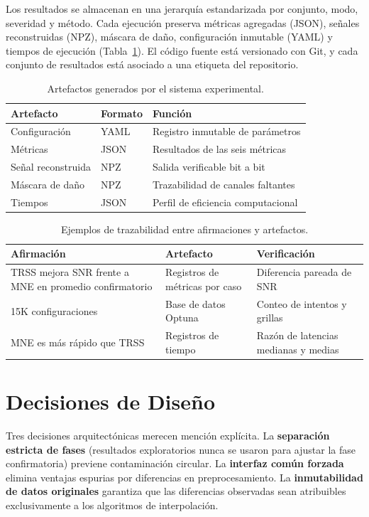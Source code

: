 Los resultados se almacenan en una jerarquía estandarizada por conjunto, modo, severidad y método. Cada ejecución preserva métricas agregadas (JSON), señales reconstruidas (NPZ), máscara de daño, configuración inmutable (YAML) y tiempos de ejecución (Tabla~\ref{tab:artifact_types}). El código fuente está versionado con Git, y cada conjunto de resultados está asociado a una etiqueta del repositorio.

\begin{table}[htbp]
\centering
\caption{Artefactos generados por el sistema experimental.}
\label{tab:artifact_types}
\small
\begin{tabular}{@{}l l l@{}}
\toprule
Artefacto & Formato & Función \\
\midrule
Configuración & YAML & Registro inmutable de parámetros \\
Métricas & JSON & Resultados de las seis métricas \\
Señal reconstruida & NPZ & Salida verificable bit a bit \\
Máscara de daño & NPZ & Trazabilidad de canales faltantes \\
Tiempos & JSON & Perfil de eficiencia computacional \\
\bottomrule
\end{tabular}
\end{table}

\begin{table}[htbp]
\centering
\caption{Ejemplos de trazabilidad entre afirmaciones y artefactos.}
\label{tab:traceability}
\small
\begin{tabular}{@{}l l l@{}}
\toprule
Afirmación & Artefacto & Verificación \\
\midrule
TRSS mejora SNR frente a MNE en promedio confirmatorio & Registros de métricas por caso & Diferencia pareada de SNR \\
15K configuraciones & Base de datos Optuna & Conteo de intentos y grillas \\
MNE es más rápido que TRSS & Registros de tiempo & Razón de latencias medianas y medias \\
\bottomrule
\end{tabular}
\end{table}

\section{Decisiones de Diseño}

Tres decisiones arquitectónicas merecen mención explícita. La \textbf{separación estricta de fases} (resultados exploratorios nunca se usaron para ajustar la fase confirmatoria) previene contaminación circular. La \textbf{interfaz común forzada} elimina ventajas espurias por diferencias en preprocesamiento. La \textbf{inmutabilidad de datos originales} garantiza que las diferencias observadas sean atribuibles exclusivamente a los algoritmos de interpolación.